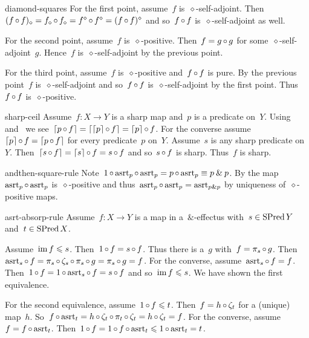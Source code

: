 \begin{solution}{diamond-squares}%
For the first point, assume~$f$ is~$\diamond$-self-adjoint.
Then~$(f \mathop{\circ} f)_\diamond
        = f_\diamond \mathop{\circ} f_\diamond
        = f^\diamond \mathop{\circ} f^\diamond
        = (f \mathop{\circ} f)^\diamond $
        and so~$f\mathop{\circ} f$ is~$\diamond$-self-adjoint as well.

For the second point, assume~$f$ is~$\diamond$-positive.
Then~$f = g \mathop{\circ} g$ for some~$\diamond$-self-adjoint~$g$.
Hence~$f$ is~$\diamond$-self-adjoint by the previous point.

For the third point, assume~$f$ is~$\diamond$-positive
    and~$f \mathop{\circ} f$ is pure.
By the previous point~$f$ is~$\diamond$-self-adjoint
        and so~$f\mathop{\circ} f$ is~$\diamond$-self-adjoint by the first point.
    Thus~$f \mathop{\circ} f$ is~$\diamond$-positive.
\end{solution}
\begin{solution}{sharp-ceil}%
Assume~$f\colon X \to Y$ is a sharp map and~$p$ is a predicate on~$Y$.
Using~
    and~
    we see~$\left\lceil p \mathop{\circ} f\right\rceil = \left\lceil\left\lceil p\right\rceil \mathop{\circ} f\right\rceil = \left\lceil p\right\rceil \mathop{\circ} f$.
For the converse assume~$\left\lceil p\right\rceil \mathop{\circ} f = \left\lceil p \mathop{\circ} f\right\rceil$
    for every predicate~$p$ on~$Y$.
Assume~$s$ is any sharp predicate on~$Y$.
    Then~$\left\lceil s \mathop{\circ} f\right\rceil = \left\lceil s\right\rceil \mathop{\circ} f = s \mathop{\circ} f$ and so~$s \mathop{\circ} f$
        is sharp.  Thus~$f$ is sharp.
\end{solution}
\begin{solution}{andthen-square-rule}%
    Note~$1 \mathop{\circ} \mathrm{asrt}_p \mathop{\circ} \mathrm{asrt}_p = p \mathop{\circ} \mathrm{asrt}_p \equiv p \mathbin{\&} p$.
By  the map~$\mathrm{asrt}_p \mathop{\circ} \mathrm{asrt}_p$
    is~$\diamond$-positive
    and thus~$\mathrm{asrt}_p \mathop{\circ} \mathrm{asrt}_p = \mathrm{asrt}_{p \mathbin{\&} p}$
    by uniqueness of~$\diamond$-positive maps.
\end{solution}
\begin{solution}{asrt-absorp-rule}%
Assume~$f\colon X\to Y$ is a map in a~$\&$-effectus
    with~$s \in \operatorname{SPred} Y$ and~$t \in \operatorname{SPred} X$.

Assume~$\operatorname{im} f \leqslant s$.
Then~$1\mathop{\circ} f = s \mathop{\circ} f$.
Thus there is a~$g$ with~$f = \pi_s \mathop{\circ} g$.
Then~$\mathrm{asrt}_s \mathop{\circ} f = \pi_s \mathop{\circ} \zeta_s \mathop{\circ}\pi_s \mathop{\circ} g
        = \pi_s \mathop{\circ} g = f$.
For the converse, assume~$\mathrm{asrt}_s \mathop{\circ} f = f$.
Then~$1 \mathop{\circ} f = 1 \mathop{\circ} \mathrm{asrt}_s \mathop{\circ} f =s \mathop{\circ} f$
    and so~$\operatorname{im} f \leqslant s$.
We have shown the first equivalence.

For the second equivalence, assume~$1 \mathop{\circ} f \leqslant t$.
    Then~$f = h \mathop{\circ} \zeta_t$ for a (unique) map~$h$.
So~$f \mathop{\circ} \mathrm{asrt}_t = h \mathop{\circ} \zeta_t \mathop{\circ} \pi_t \mathop{\circ} \zeta_t
        = h \mathop{\circ} \zeta_t = f$.
For the converse, assume~$f = f \mathop{\circ} \mathrm{asrt}_t$.
Then~$1 \mathop{\circ} f = 1 \mathop{\circ} f \mathop{\circ} \mathrm{asrt}_t \leqslant 1 \mathop{\circ} \mathrm{asrt}_t = t$.
\end{solution}
